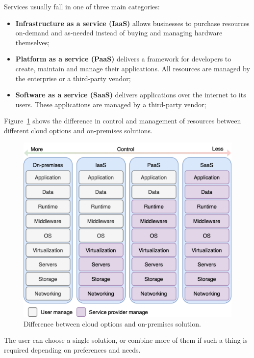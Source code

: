 Services usually fall in one of three main categories: 

\begin{itemize}
	\item \textbf{Infrastructure as a service (IaaS)} allows businesses to purchase resources on-demand and as-needed instead of buying and managing hardware themselves;
	\item \textbf{Platform as a service (PaaS)} delivers a framework for developers to create, maintain and manage their applications. All resources are managed by the enterprise or a third-party vendor;
	\item \textbf{Software as a service (SaaS)} delivers applications over the internet to its users. These applications are managed by a third-party vendor;
\end{itemize}

\noindent
Figure~\ref{fig:fig1} shows the difference in control and management of resources between different cloud options and on-premises solutions.

\begin{figure}[H]
	\begin{center}
		\includegraphics[scale=0.80]{images/Figure1}
	\end{center}
	\vspace{-0.6cm}
	\caption{Difference between cloud options and on-premises solution.}
	\label{fig:fig1}
\end{figure}

\noindent
The user can choose a single solution, or combine more of them if such a thing is required depending on preferences and needs.

